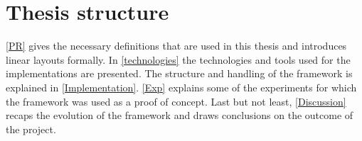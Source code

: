 \section{Thesis structure}
\autoref{PR} gives the necessary definitions that are used in this thesis and introduces linear layouts formally.
In \autoref{technologies} the technologies and tools used for the implementations are presented.
The structure and handling of the framework is explained in \autoref{Implementation}.
\autoref{Exp} explains some of the experiments for which the framework was used as a proof of concept.
Last but not least, \autoref{Discussion} recaps the evolution of the framework and draws conclusions on the outcome of the project.



